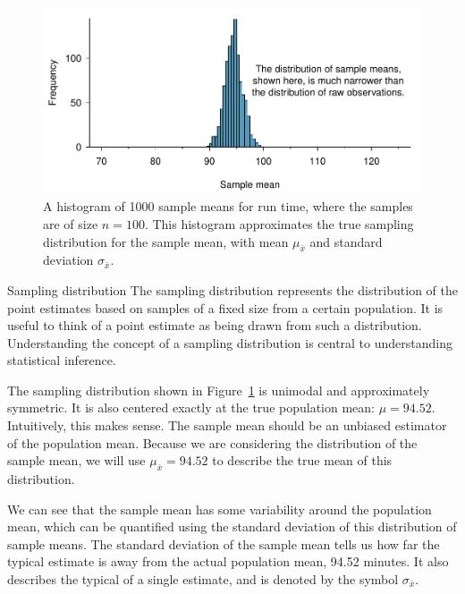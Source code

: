 \begin{figure}[h]
   \centering
   \includegraphics[width=\textwidth]{ch_distributions/figures/netTime1000SamplingDistribution/netTime1000SamplingDistribution}
   \caption{A histogram of 1000 sample means for run time, where the samples are of size $n=100$. This histogram approximates the true sampling distribution for the sample mean, with mean $\mu_{\bar{x}}$ and standard deviation $\sigma_{\bar{x}}$.}
   \label{netTime1000SamplingDistribution}
\end{figure}

\begin{onebox}{Sampling distribution}
The sampling distribution represents the distribution of the point estimates based on samples of a fixed size from a certain population. It is useful to think of a point estimate as being drawn from such a distribution. Understanding the concept of a sampling distribution is central to understanding statistical inference.\end{onebox}


The sampling distribution shown in Figure~\ref{netTime1000SamplingDistribution} is unimodal and approximately symmetric. It is also centered exactly at the true population mean: $\mu=94.52$. Intuitively, this makes sense. The sample mean should be an unbiased estimator of the population mean. Because we are considering the distribution of the sample mean, we will use $\mu_{\bar{x}} = 94.52$ to describe the true mean of this distribution.

\D{\newpage}

We can see that the sample mean has some variability around the population mean, which can be quantified using the standard deviation of this distribution of sample means. The standard deviation of the sample mean tells us how far the typical estimate is away from the actual population mean, 94.52 minutes. It also describes the typical  of a single estimate, and is denoted by the symbol $\sigma_{\bar{x}}$. 

